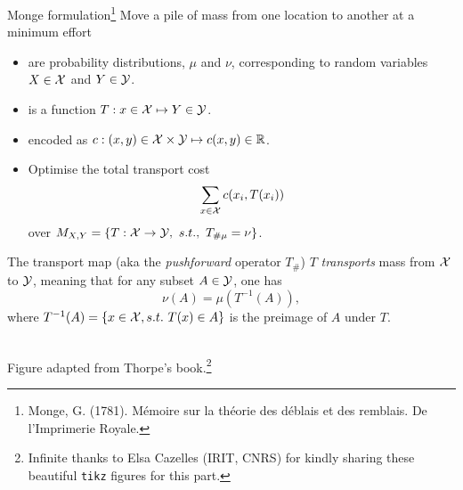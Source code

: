 \documentclass[pdf,aspectratio=169,10pt]{beamer}
\begin{document}
\begin{frame}[plain]{Monge formulation\footnote{Monge, G. (1781).
Mémoire sur la théorie des déblais et des remblais.
De l'Imprimerie Royale.}}
 Move a pile of mass from one location to another at a minimum effort\\
\vspace{1em}

\begin{minipage}[t]{0.69\textwidth}

   \begin{itemize}
       \item {} are probability distributions, $\mu$ and $\nu$, corresponding to random variables $X\in{\mathcal{X}}$ and $Y\in{\mathcal{Y}}$. 
       \item {} is a function $T: x \in {\mathcal{X}}\mapsto Y\in{\mathcal{Y}}$.
    \item {} encoded as $c: (x,y)\in{\mathcal{X}}\times{\mathcal{Y}}\mapsto c(x,y)\in{\mathbb{R}}$.
    \item Optimise the total transport cost
    \begin{equation}
        \sum_{x\in{\mathcal{X}}} c(x_i, T(x_i))
    \end{equation}
    over $M_{X,Y} = \{ T: {\mathcal{X}} \to {\mathcal{Y}},\ s.t.,\ T_{\#\mu}=\nu \}$.
   \end{itemize}
\end{minipage}   
\hfill
\begin{minipage}{0.3\textwidth}
       
\end{minipage}   

\end{frame}


\begin{frame}{The transport map (aka the \emph{pushforward} operator $T_\#$)}
    $T$ \emph{transports} mass from ${\mathcal{X}}$ to ${\mathcal{Y}}$, meaning that for any subset $A\in{\mathcal{Y}}$, one has 
    \begin{equation}
        \nu(A) = \mu(T^{-1}(A)),
    \end{equation}
    where $T^{-1}(A)=\{x\in{\mathcal{X}}, s.t.\ T(x)\in A \}$ is the preimage of $A$ under $T$.


\\
{\small Figure adapted from Thorpe's book.\footnote{Infinite thanks to Elsa Cazelles (IRIT, CNRS) for kindly sharing these beautiful \texttt{tikz} figures for this part.}}
\end{frame}
\end{document}
